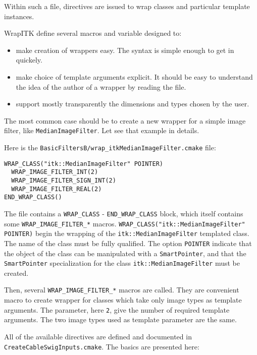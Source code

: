 \documentclass{InsightArticle}
\begin{document}
Within such a file, directives are issued to wrap classes and particular
template instances. 

WrapITK define several macros and variable designed to:
\begin{itemize}
  \item make creation of wrappers easy. The syntax is simple enough to get in quickely.
  \item make choice of template arguments explicit. It should be easy to understand
the idea of the author of a wrapper by reading the file.
  \item support mostly transparently the dimensions and types chosen by the user.
\end{itemize}

The most common case should be to create a new wrapper for a simple image filter, like 
\verb$MedianImageFilter$. Let see that example in details.

Here is the \verb$BasicFiltersB/wrap_itkMedianImageFilter.cmake$ file:

\small \begin{verbatim}
WRAP_CLASS("itk::MedianImageFilter" POINTER)
  WRAP_IMAGE_FILTER_INT(2)
  WRAP_IMAGE_FILTER_SIGN_INT(2)
  WRAP_IMAGE_FILTER_REAL(2)
END_WRAP_CLASS()
\end{verbatim} \normalsize

The file contains a \verb$WRAP_CLASS$ - \verb$END_WRAP_CLASS$ block, which itself contains
some \verb$WRAP_IMAGE_FILTER_*$ macros. \verb$WRAP_CLASS("itk::MedianImageFilter" POINTER)$
begin the wrapping of the \verb$itk::MedianImageFilter$ templated class. The name of the class
must be fully qualified. The option \verb$POINTER$ indicate that the object of the class can be
manipulated with a \verb$SmartPointer$, and that the \verb$SmartPointer$ specialization for
the class \verb$itk::MedianImageFilter$ must be created.

Then, several \verb$WRAP_IMAGE_FILTER_*$ macros are called. They are convenient macro to
create wrapper for classes which take only image types as template arguments. The parameter,
here \verb$2$, give the number of required template arguments. The two image types used as
template parameter are the same.

All of the available directives are defined and documented
in \verb$CreateCableSwigInputs.cmake$. The basics are presented here:
\end{document}
